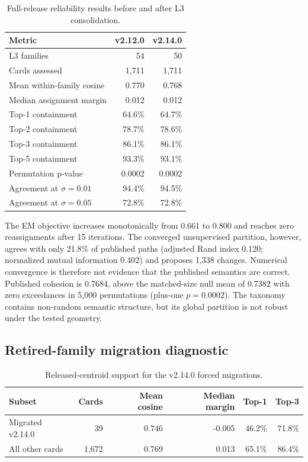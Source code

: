 \documentclass[11pt,a4paper]{article}
\begin{document}
\begin{table}[H]
\centering
\caption{Full-release reliability results before and after L3 consolidation.}
\small
\begin{tabular}{lrr}
\toprule
Metric & v2.12.0 & v2.14.0 \\
\midrule
L3 families & 54 & 50 \\
Cards assessed & 1,711 & 1,711 \\
Mean within-family cosine & 0.770 & 0.768 \\
Median assignment margin & 0.012 & 0.012 \\
Top-1 containment & 64.6\% & 64.7\% \\
Top-2 containment & 78.7\% & 78.6\% \\
Top-3 containment & 86.1\% & 86.1\% \\
Top-5 containment & 93.3\% & 93.1\% \\
Permutation p-value & 0.0002 & 0.0002 \\
Agreement at $\sigma=0.01$ & 94.4\% & 94.5\% \\
Agreement at $\sigma=0.05$ & 72.8\% & 72.8\% \\
\bottomrule
\end{tabular}
\end{table}

The EM objective increases monotonically from 0.661 to 0.800 and reaches zero
reassignments after 15 iterations. The converged unsupervised partition,
however, agrees with only 21.8\% of published paths (adjusted Rand index 0.120;
normalized mutual information 0.402) and proposes 1,338 changes. Numerical
convergence is therefore not evidence that the published semantics are correct.
Published cohesion is 0.7684, above the matched-size null mean of 0.7382 with zero
exceedances in 5,000 permutations (plus-one $p=0.0002$). The taxonomy contains
non-random semantic structure, but its global partition is not robust under the
tested geometry.

\subsection{Retired-family migration diagnostic}

\begin{table}[H]
\centering
\caption{Released-centroid support for the v2.14.0 forced migrations.}
\begin{tabular}{lrrrrr}
\toprule
Subset & Cards & Mean cosine & Median margin & Top-1 & Top-3 \\
\midrule
Migrated v2.14.0 & 39 & 0.746 & -0.005 & 46.2\% & 71.8\% \\
All other cards & 1,672 & 0.769 & 0.013 & 65.1\% & 86.4\% \\
\bottomrule
\end{tabular}
\end{table}
\end{document}
